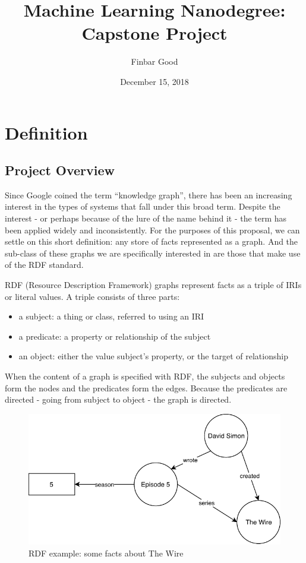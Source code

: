 \documentclass[12pt]{article}
\begin{document}
\title{Machine Learning Nanodegree: Capstone Project}
\author{Finbar Good}
\date{December 15, 2018}

\maketitle
   
\setlength{\parindent}{0cm}
\setlength{\parskip}{0.5\baselineskip}

\section{Definition}\label{i.-definition}

\subsection{Project Overview}\label{project-overview}
Since Google coined the term ``knowledge graph'', there has been an
increasing interest in the types of systems that fall under this broad
term\cite{ehrlinger2016towards}. Despite the interest - or perhaps
because of the lure of the name behind it - the term has been applied
widely and inconsistently. For the purposes of this proposal, we can
settle on this short definition: any store of facts represented as a
graph. And the sub-class of these graphs we are specifically interested
in are those that make use of the RDF standard.

RDF (Resource Description Framework) graphs \cite{w3RDF} represent facts
as a triple of IRIs or literal values. A triple consists of three parts:

\begin{itemize}
\item a subject: a thing or class, referred to using an IRI
\item a predicate: a property or relationship of the subject
\item an object: either the value subject's property, or the target of
  relationship
\end{itemize}

When the content of a graph is specified with RDF, the subjects and
objects form the nodes and the predicates form the edges. Because the
predicates are directed - going from subject to object - the graph is
directed.

\begin{figure}
  \centering
  \includegraphics{images/rdf-the-wire.pdf}
  \caption{RDF example: some facts about The Wire}
\end{figure}
\end{document}
